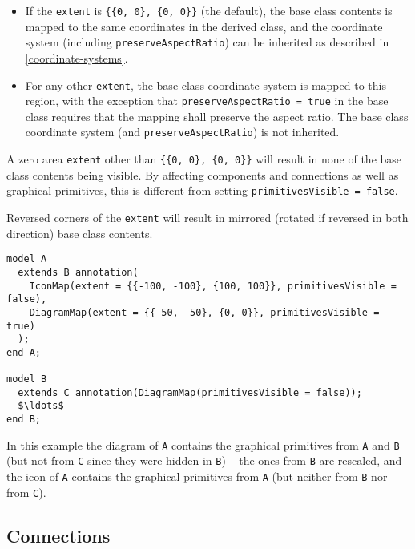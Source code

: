 \begin{itemize}
\item
  If the \lstinline!extent! is \lstinline!{{0, 0}, {0, 0}}! (the default), the base class contents is mapped to the same coordinates in the derived class, and the coordinate system (including \lstinline!preserveAspectRatio!) can be inherited as described in \cref{coordinate-systems}.
\item
  For any other \lstinline!extent!, the base class coordinate system is mapped to this region, with the exception that \lstinline!preserveAspectRatio = true! in the base class requires that the mapping shall preserve the aspect ratio.
  The base class coordinate system (and \lstinline!preserveAspectRatio!) is not inherited.
\end{itemize}

\begin{nonnormative}
A zero area \lstinline!extent! other than \lstinline!{{0, 0}, {0, 0}}! will result in none of the base class contents being visible.
By affecting components and connections as well as graphical primitives, this is different from setting \lstinline!primitivesVisible = false!.

Reversed corners of the \lstinline!extent! will result in mirrored (rotated if reversed in both direction) base class contents.
\end{nonnormative}

\begin{example}
\begin{lstlisting}[language=modelica]
model A
  extends B annotation(
    IconMap(extent = {{-100, -100}, {100, 100}}, primitivesVisible = false),
    DiagramMap(extent = {{-50, -50}, {0, 0}}, primitivesVisible = true)
  );
end A;

model B
  extends C annotation(DiagramMap(primitivesVisible = false));
  $\ldots$
end B;
\end{lstlisting}
In this example the diagram of \lstinline!A! contains the graphical primitives from \lstinline!A! and \lstinline!B! (but not from \lstinline!C! since they were hidden in \lstinline!B!) -- the ones from \lstinline!B! are rescaled, and the icon of \lstinline!A! contains the graphical primitives from \lstinline!A! (but neither from \lstinline!B! nor from \lstinline!C!).
\end{example}

\subsection{Connections}\label{connections1}

